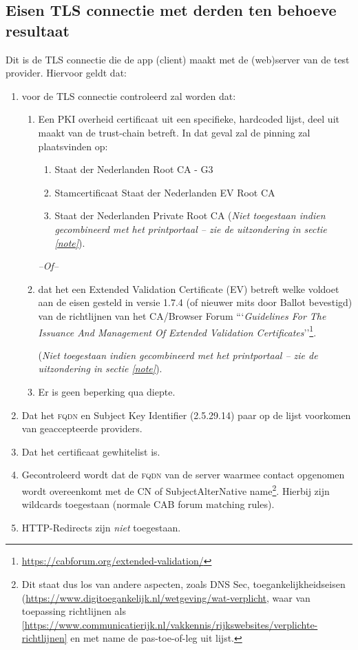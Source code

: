 \documentclass[11.0pt]{report}
\begin{document}
\subsection{Eisen TLS connectie met derden ten behoeve resultaat}
\label{tlstest}

Dit is de TLS connectie die de app (client) maakt met de (web)server van de test provider. Hiervoor geldt dat:

\begin{enumerate}
\item voor de TLS connectie controleerd zal worden dat: 
\begin{enumerate}
\item Een PKI overheid certificaat uit een specifieke, hardcoded lijst, deel uit maakt van de trust-chain betreft. In dat geval zal de pinning zal plaatsvinden op:
\begin{enumerate}
\item Staat der Nederlanden Root CA - G3
\item Stamcertificaat Staat der Nederlanden EV Root CA 
\item Staat der Nederlanden Private Root CA (\emph{Niet toegestaan indien gecombineerd met het printportaal -- zie de uitzondering in sectie \ref{note}}).\label{priv}
\end{enumerate}

\emph{--Of--}

\item  dat het een Extended Validation Certificate (EV) betreft welke voldoet aan de eisen gesteld in versie 1.7.4 (of nieuwer mits door Ballot bevestigd) van de richtlijnen van het CA/Browser Forum ```\emph{Guidelines For The Issuance And Management Of Extended Validation Certificates}''\footnote{\url{https://cabforum.org/extended-validation/}}.

(\emph{Niet toegestaan indien gecombineerd met het printportaal -- zie de uitzondering in sectie \ref{note}}).
\label{cab}
\item Er is geen beperking qua diepte.
\end{enumerate}

\item   Dat het \textsc{fqdn} en Subject Key Identifier (2.5.29.14) paar op de lijst voorkomen van geaccepteerde providers.
\item 	Dat het certificaat gewhitelist is.
\item 	Gecontroleerd wordt dat de \textsc{fqdn} van de server waarmee contact opgenomen wordt overeenkomt met de CN of SubjectAlterNative name\footnote{Dit staat dus los van andere aspecten, zoals DNS Sec, toegankelijkheidseisen (\url{https://www.digitoegankelijk.nl/wetgeving/wat-verplicht}, waar van toepassing richtlijnen als \ref{https://www.communicatierijk.nl/vakkennis/rijkswebsites/verplichte-richtlijnen} en met name de pas-toe-of-leg uit lijst.}. Hierbij zijn wildcards toegestaan (normale CAB forum matching rules).
\item HTTP-Redirects zijn \emph{niet} toegestaan.
\end{enumerate}
\end{document}
